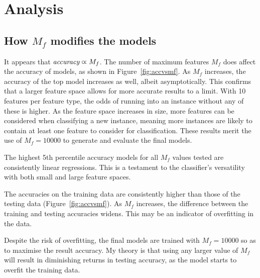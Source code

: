 \documentclass[11pt]{article}
\begin{document}
\section{Analysis}


\subsection{How $M_f$ modifies the models}\label{sec:mfanalysis}

It appears that $\emph{accuracy} \varpropto M_f$.
The number of maximum features $M_f$ does affect the accuracy of models, as shown in Figure~\ref{fig:accvsmf}.
As $M_f$ increases, the accuracy of the top model increases as well, albeit asymptotically.
This confirms that a larger feature space allows for more accurate results to a limit.
With 10 features per feature type, the odds of running into an instance without any of these is higher. 
As the feature space increases in size, more features can be considered when classifying a new instance, 
meaning more instances are likely to contain at least one feature to consider for classification.
These results merit the use of $M_f = 10000$ to generate and evaluate the final models.

The highest 5th percentile accuracy models for all $M_f$ values tested are consistently linear regressions.
This is a testament to the classifier's versatility with both small and large feature spaces.

The accuracies on the training data are consistently higher than those of the testing data (Figure~\ref{fig:accvsmf}).
As $M_f$ increases, the difference between the training and testing accuracies widens. 
This may be an indicator of overfitting in the data. 

Despite the risk of overfitting, 
the final models are trained with $M_f = 10000$ so as to maximise the result accuracy.
My theory is that using any larger value of $M_f$ will result in diminishing returns in testing accuracy, 
as the model starts to overfit the training data.
\end{document}
